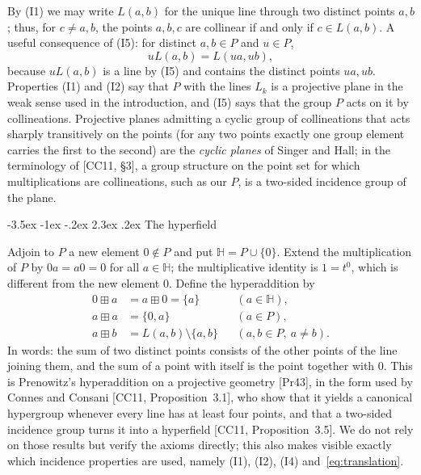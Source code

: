 \documentclass[12pt]{article}
\makeatletter
\renewcommand\section{\@startsection{section}{1}{\z@}%
  {-3.5ex \@plus -1ex \@minus -.2ex}%
  {2.3ex \@plus.2ex}%
  {\normalfont\bfseries}}
\theoremstyle{plain}
\theoremstyle{definition}
\newcommand{\Hh}{\mathbb{H}}
\newcommand{\bp}{\boxplus}
\makeatother
\begin{document}
By (I1) we may write $L(a,b)$ for the unique line through two distinct
points $a,b$; thus, for $c\neq a,b$, the points $a,b,c$ are collinear if
and only if $c\in L(a,b)$.  A useful consequence of (I5): for distinct
$a,b\in P$ and $u\in P$,
\begin{equation}\label{eq:translation}
 uL(a,b)=L(ua,ub),
\end{equation}
because $uL(a,b)$ is a line by (I5) and contains the distinct points
$ua,ub$.  Properties (I1) and (I2) say that $P$ with the lines $L_k$ is
a projective plane in the weak sense used in the introduction, and (I5)
says that the group $P$ acts on it by collineations.  Projective planes admitting a
cyclic group of collineations that acts sharply transitively on the
points (for any two points exactly one group element carries the first
to the second) are the \emph{cyclic planes} of Singer and Hall; in the
terminology of [CC11, \S3], a group structure on the point set for
which multiplications are collineations, such as our $P$, is a
two-sided incidence group of the plane.

\section{The hyperfield}\label{sec:hyperfield}

Adjoin to $P$ a new element $0\notin P$ and put $\Hh=P\cup\{0\}$.
Extend the multiplication of $P$ by $0a=a0=0$ for all $a\in\Hh$; the
multiplicative identity is $1=t^0$, which is different from the new
element $0$.  Define the hyperaddition by
\begin{equation}\label{eq:addition}
 \begin{aligned}
 0\bp a&=a\bp0=\{a\} &&(a\in\Hh),\\
 a\bp a&=\{0,a\} &&(a\in P),\\
 a\bp b&=L(a,b)\setminus\{a,b\}
       &&(a,b\in P,\ a\neq b).
 \end{aligned}
\end{equation}
In words: the sum of two distinct points consists of the other points of
the line joining them, and the sum of a point with itself is the point
together with $0$.  This is Prenowitz's hyperaddition on a projective
geometry [Pr43], in the form used by Connes and Consani
[CC11, Proposition~3.1], who show that it yields a canonical hypergroup
whenever every line has at least four points, and that a two-sided
incidence group turns it into a hyperfield [CC11, Proposition~3.5].  We
do not rely on those results but verify the axioms directly; this also
makes visible exactly which incidence properties are used, namely
(I1), (I2), (I4) and~\eqref{eq:translation}.
\end{document}
